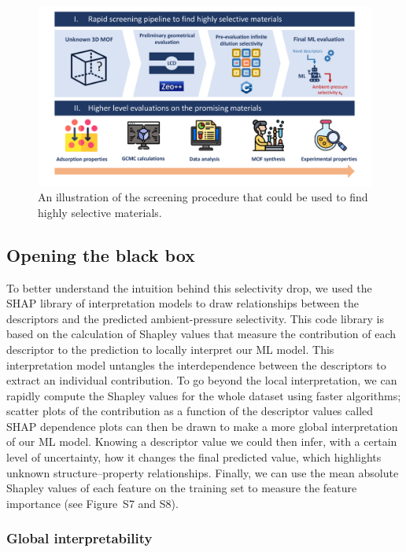 \documentclass[main]{subfiles}
\begin{document}
\begin{figure}[ht]
\centering
  \includegraphics[width=0.99\linewidth]{figures/4-ml/main/pipeline.pdf}
  \caption{An illustration of the screening procedure that could be used to find highly selective materials.}
  \label{fgr:pipeline}
\end{figure}

\subsection{Opening the black box}

To better understand the intuition behind this selectivity drop, we used the SHAP\cite{SHAP,molnar2020interpretable} library of interpretation models to draw relationships between the descriptors and the predicted ambient-pressure selectivity. This code library is based on the calculation of Shapley values\cite{shapley1953value} that measure the contribution of each descriptor to the prediction to locally interpret our ML model. This interpretation model untangles the interdependence between the descriptors to extract an individual contribution. To go beyond the local interpretation, we can rapidly compute the Shapley values for the whole dataset using faster algorithms;\cite{SHAP} scatter plots of the contribution as a function of the descriptor values called SHAP dependence plots can then be drawn to make a more global interpretation of our ML model. Knowing a descriptor value we could then infer, with a certain level of uncertainty, how it changes the final predicted value, which highlights unknown structure--property relationships. Finally, we can use the mean absolute Shapley values of each feature on the training set to measure the feature importance (see Figure~S7 and S8).

\subsubsection{Global interpretability}
\end{document}

